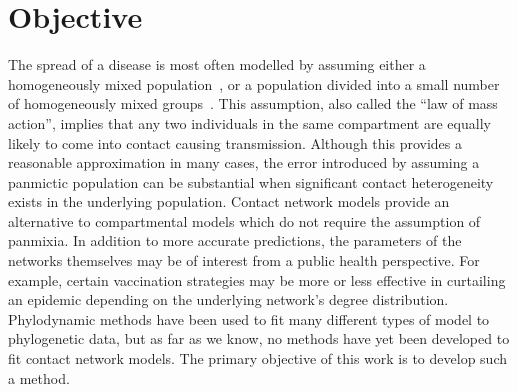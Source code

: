 \section{Objective}

The spread of a disease is most often modelled by assuming either a
homogeneously mixed population~\autocite{hamer1906milroy,
kermack1927contribution}, or a population divided into a small number of
homogeneously mixed groups~\autocite{rushton1955deterministic}. This
assumption, also called the ``law of mass action'', implies that any two
individuals in the same compartment are equally likely to come into contact
causing transmission. Although this provides a reasonable approximation in many
cases, the error introduced by assuming a panmictic population can be
substantial when significant contact heterogeneity exists in the underlying
population. Contact network models provide an alternative to compartmental
models which do not require the assumption of panmixia. In addition to more
accurate predictions, the parameters of the networks themselves may be of
interest from a public health perspective. For example, certain vaccination
strategies may be more or less effective in curtailing an epidemic depending on
the underlying network's degree distribution. Phylodynamic methods have been
used to fit many different types of model to phylogenetic data, but as far as
we know, no methods have yet been developed to fit contact network models. The
primary objective of this work is to develop such a method.

\newcommand{\G}{\mathcal{G}}
\newcommand{\Nu}{\mathcal{N}}

